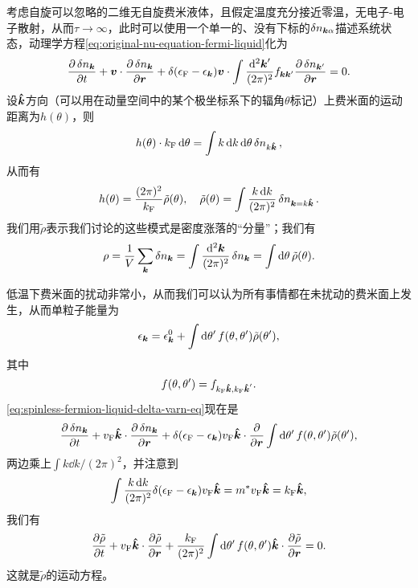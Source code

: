 考虑自旋可以忽略的二维无自旋费米液体，且假定温度充分接近零温，无电子-电子散射，从而$\tau \to \infty$，此时可以使用一个单一的、没有下标的$\var{n_{\vb*{k} \alpha}}$描述系统状态，动理学方程\eqref{eq:original-nu-equation-fermi-liquid}化为
\begin{equation}
    \pdv{\var{n_{\vb*{k}}}}{t} + \vb*{v} \cdot \pdv{\var{n_{\vb*{k}}}}{\vb*{r}} + \delta(\epsilon_\text{F} - \epsilon_{\vb*{k}}) \vb*{v} \cdot \int \frac{\dd[2]{\vb*{k}'}}{(2\pi)^2} {f}_{\vb*{k} \vb*{k}'} \pdv{\var{{n}_{\vb*{k}'}}}{\vb*{r}} = 0.
    \label{eq:spinless-fermion-liquid-delta-varn-eq}
\end{equation}
设$\vu*{k}$方向（可以用在动量空间中的某个极坐标系下的辐角$\theta$标记）上费米面的运动距离为$h(\theta)$，则
\[
    h(\theta) \cdot k_\text{F} \dd{\theta} = \int k \dd{k} \dd{\theta} \var{n}_{k \vu*{k}},
\]
从而有
\begin{equation}
    h(\theta) = \frac{(2\pi)^2}{k_\text{F}} \tilde{\rho}(\theta) , \quad \tilde{\rho}(\theta) = \int \frac{k \dd{k}}{(2\pi)^2} \var{n}_{\vb*{k} = k \vu*{k}}.
\end{equation}
我们用$\tilde{\rho}$表示我们讨论的这些模式是密度涨落的“分量”；我们有
\begin{equation}
    \rho = \frac{1}{V} \sum_{\vb*{k}} \var{n}_{\vb*{k}} = \int \frac{\dd[2]{\vb*{k}}}{(2\pi)^2} \var{n}_{\vb*{k}} = \int \dd{\theta} \tilde{\rho}(\theta).
\end{equation}

低温下费米面的扰动非常小，从而我们可以认为所有事情都在未扰动的费米面上发生，从而单粒子能量为
\begin{equation}
    \epsilon_{\vb*{k}} = \epsilon_{\vb*{k}}^0 + \int \dd{\theta'} f(\theta, \theta') \tilde{\rho}(\theta'),
\end{equation}
其中
\begin{equation}
    f(\theta, \theta') = f_{k_\text{F} \vu*{k}, k_\text{F} \vu*{k}'}.
\end{equation}
\eqref{eq:spinless-fermion-liquid-delta-varn-eq}现在是
\[
    \pdv{\var{n_{\vb*{k}}}}{t} + v_\text{F} \vu*{k} \cdot \pdv{\var{n}_{\vb*{k}}}{\vb*{r}} + \delta(\epsilon_\text{F} - \epsilon_{\vb*{k}}) v_\text{F} \vu*{k} \cdot \pdv{\vb*{r}} \int \dd{\theta'} f(\theta, \theta') \tilde{\rho}(\theta'),
\]
两边乘上$\int k \dd{k} / (2\pi)^2$，并注意到
\[
    \int \frac{k \dd{k}}{(2\pi)^2} \delta(\epsilon_\text{F} - \epsilon_{\vb*{k}}) v_\text{F} \vu*{k} = m^* v_\text{F} \vu*{k} = k_\text{F} \vu*{k},
\]
我们有
\begin{equation}
    \pdv{\tilde{\rho}}{t} + v_\text{F} \vu*{k} \cdot \pdv{\tilde{\rho}}{\vb*{r}} + \frac{k_\text{F}}{(2\pi)^2} \int \dd{\theta'} f(\theta, \theta') \vu*{k} \cdot \pdv{\tilde{\rho}}{\vb*{r}} = 0.
    \label{eq:fermi-liquid-rho-tilde-eq}
\end{equation}
这就是$\tilde{\rho}$的运动方程。

